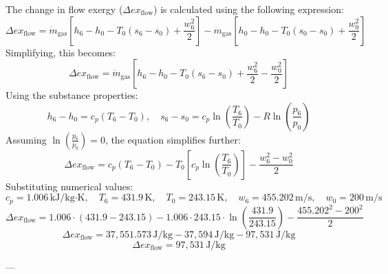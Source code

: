The change in flow exergy (\( \Delta ex_{\text{flow}} \)) is calculated using the following expression:  
\[
\Delta ex_{\text{flow}} = \dot{m}_{\text{gas}} \left[ h_6 - h_0 - T_0 (s_6 - s_0) + \frac{w_6^2}{2} \right] - \dot{m}_{\text{gas}} \left[ h_0 - h_0 - T_0 (s_0 - s_0) + \frac{w_0^2}{2} \right]
\]  
Simplifying, this becomes:  
\[
\Delta ex_{\text{flow}} = \dot{m}_{\text{gas}} \left[ h_6 - h_0 - T_0 (s_6 - s_0) + \frac{w_6^2}{2} - \frac{w_0^2}{2} \right]
\]  
Using the substance properties:  
\[
h_6 - h_0 = c_p (T_6 - T_0), \quad s_6 - s_0 = c_p \ln \left( \frac{T_6}{T_0} \right) - R \ln \left( \frac{p_6}{p_0} \right)
\]  
Assuming \( \ln \left( \frac{p_6}{p_0} \right) = 0 \), the equation simplifies further:  
\[
\Delta ex_{\text{flow}} = c_p (T_6 - T_0) - T_0 \left[ c_p \ln \left( \frac{T_6}{T_0} \right) \right] - \frac{w_6^2 - w_0^2}{2}
\]  
Substituting numerical values:  
\[
c_p = 1.006 \, \text{kJ/kg·K}, \quad T_6 = 431.9 \, \text{K}, \quad T_0 = 243.15 \, \text{K}, \quad w_6 = 455.202 \, \text{m/s}, \quad w_0 = 200 \, \text{m/s}
\]  
\[
\Delta ex_{\text{flow}} = 1.006 \cdot (431.9 - 243.15) - 1.006 \cdot 243.15 \cdot \ln \left( \frac{431.9}{243.15} \right) - \frac{455.202^2 - 200^2}{2}
\]  
\[
\Delta ex_{\text{flow}} = 37,551.573 \, \text{J/kg} - 37,594 \, \text{J/kg} - 97,531 \, \text{J/kg}
\]  
\[
\Delta ex_{\text{flow}} = 97,531 \, \text{J/kg}
\]  

---